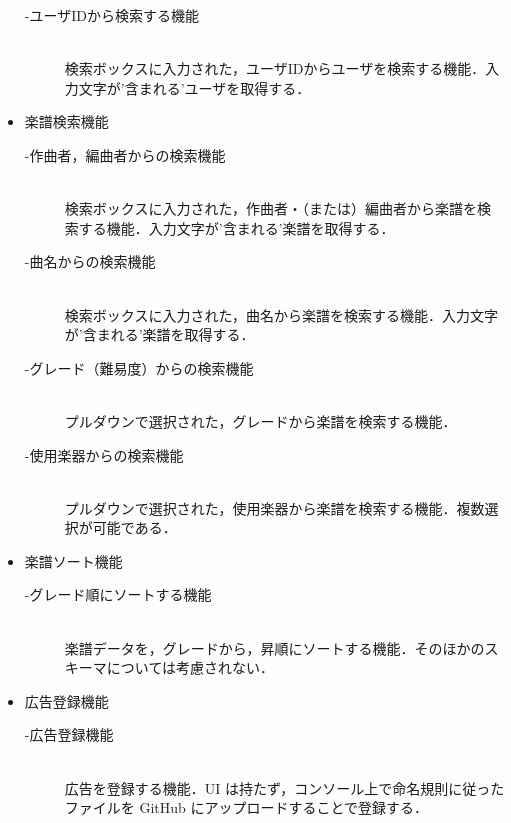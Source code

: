 \begin{itemize}
\begin{description}
		      \item[-ユーザIDから検索する機能] \mbox{}\\
			      検索ボックスに入力された，ユーザIDからユーザを検索する機能．入力文字が'含まれる'ユーザを取得する．
	      \end{description}
	\item 楽譜検索機能
	      \begin{description}
		      \item[-作曲者，編曲者からの検索機能]\mbox{}\\
		      検索ボックスに入力された，作曲者・（または）編曲者から楽譜を検索する機能．入力文字が'含まれる'楽譜を取得する．
		      \item[-曲名からの検索機能] \mbox{}\\
			      検索ボックスに入力された，曲名から楽譜を検索する機能．入力文字が'含まれる'楽譜を取得する．
		      \item[-グレード（難易度）からの検索機能] \mbox{}\\
			      プルダウンで選択された，グレードから楽譜を検索する機能．
		      \item[-使用楽器からの検索機能] \mbox{}\\
			      プルダウンで選択された，使用楽器から楽譜を検索する機能．複数選択が可能である．
	      \end{description}
	\item 楽譜ソート機能
	      \begin{description}
		      \item[-グレード順にソートする機能] \mbox{}\\
			      楽譜データを，グレードから，昇順にソートする機能．そのほかのスキーマについては考慮されない．
	      \end{description}
	\item 広告登録機能
	      \begin{description}
		      \item[-広告登録機能]\mbox{}\\
		      広告を登録する機能．UI は持たず，コンソール上で命名規則に従ったファイルを
		      GitHub にアップロードすることで登録する．
	      \end{description}
\end{itemize}
